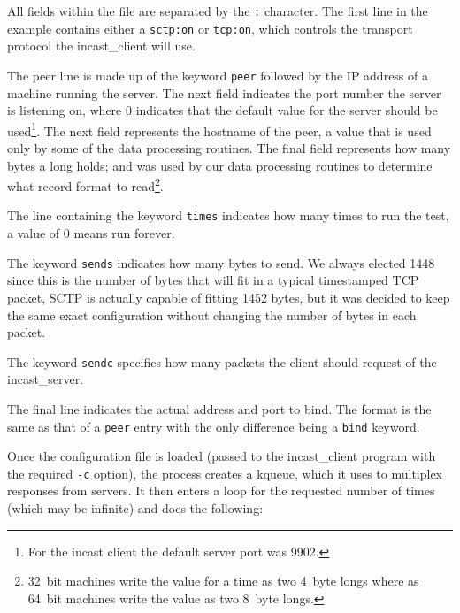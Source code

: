 \documentclass[12pt]{article}
\begin{document}
All fields within the file are separated by the \texttt{:} character.
The first line in the example contains either a \texttt{sctp:on} or
\texttt{tcp:on}, which controls the transport protocol
the incast\_client will use. 

The peer line is made up of the keyword \texttt{peer} followed by the IP address of a
machine running the server. The next field indicates the port  number the server is
listening on, where 0 indicates that the default value for the server
should be used\footnote{For the incast
client the default server port was 9902.}. The next field represents
the hostname of the peer, a value 
that is used only by some of the data processing routines. The final field represents how many bytes a
long holds; and was used by our data processing routines to determine what record format
to read\footnote{32~bit machines write the value for a time as two 4~byte longs where as 64~bit machines
write the value as two 8~byte longs.}.

The line containing the keyword \texttt{times} indicates how many times to run the test, a value of 0
means run forever.

The keyword \texttt{sends} indicates how many bytes to send. We always elected 1448 since this is
the number of bytes that will fit in a typical timestamped TCP packet, SCTP is actually capable
of fitting 1452 bytes, but it was decided to keep the same exact configuration without changing
the number of bytes in each packet.

The keyword \texttt{sendc} specifies how many packets the client should request of the incast\_server.

The final line indicates the actual address and port to bind. The format is the same as that
of a \texttt{peer} entry with the only difference being a \texttt{bind} keyword.

Once the configuration file is loaded (passed to the incast\_client program with the required
\texttt{-c} option), the process creates a kqueue, which it uses to multiplex responses from
servers. It then enters a loop for the requested number of times (which may be infinite) and
does the following:

\end{document}
